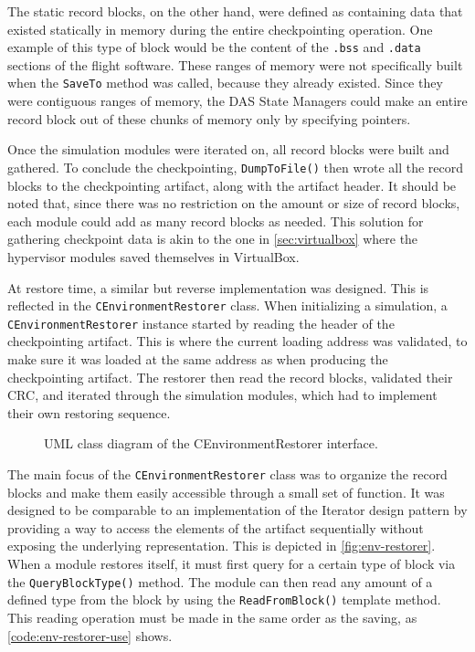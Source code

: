 {The static record blocks, on the other hand, were defined as containing data that existed statically in memory during the entire checkpointing operation. One example of this type of block would be the content of the \texttt{.bss} and \texttt{.data} sections of the flight software. These ranges of memory were not specifically built when the \texttt{SaveTo} method was called, because they already existed. Since they were contiguous ranges of memory, the DAS State Managers could make an entire record block out of these chunks of memory only by specifying pointers. 

Once the simulation modules were iterated on, all record blocks were built and gathered. To conclude the checkpointing, \texttt{DumpToFile()} then wrote all the record blocks to the checkpointing artifact, along with the artifact header. It should be noted that, since there was no restriction on the amount or size of record blocks, each module could add as many record blocks as needed. This solution for gathering checkpoint data is akin to the one in \autoref{sec:virtualbox} where the hypervisor modules saved themselves in VirtualBox.

At restore time, a similar but reverse implementation was designed. This is reflected in the \texttt{CEnvironmentRestorer} class. When initializing a simulation, a \texttt{CEnvironmentRestorer} instance started by reading the header of the checkpointing artifact. This is where the current  loading address was validated, to make sure it was loaded at the same address as when producing the checkpointing artifact. The restorer then read the record blocks, validated their CRC, and iterated through the simulation modules, which had to implement their own restoring sequence.

\begin{figure}[htbp]
	\centering
	\vspace{12pt}
	\footnotesize
	
	\caption{UML class diagram of the CEnvironmentRestorer interface.}
	\label{fig:env-restorer}
\end{figure}

The main focus of the \texttt{CEnvironmentRestorer} class was to organize the record blocks and make them easily accessible through a small set of function. It was designed to be comparable to an implementation of the Iterator design pattern by providing a way to access the elements of the artifact sequentially without exposing the underlying representation\cite{misc:iterator-des-pat}. This is depicted in \autoref{fig:env-restorer}. When a module restores itself, it must first query for a certain type of block via the \texttt{QueryBlockType()} method. The module can then read any amount of a defined type from the block by using the \texttt{ReadFromBlock()} template method. This reading operation must be made in the same order as the saving, as \autoref{code:env-restorer-use} shows.

}
